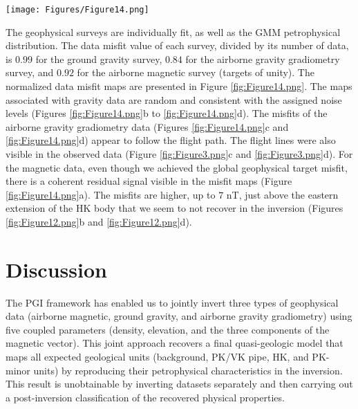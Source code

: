 \documentclass[paper, twocolumn]{geophysics} %
\begin{document}


\begin{figure*}[!ht]
\centering
\texttt{[image: Figures/Figure14.png]}
\caption{Normalized data misfits for all the datasets from the multi-physics PGI with geological domains and four rock units. (a) For the magnetic data; (b) for the gravity data; (c) and (d) for the gravity gradiometry data.}
\label{fig:Figure14.png}
\end{figure*}

The geophysical surveys are individually fit, as well as the GMM petrophysical distribution. The data misfit value of each survey, divided by its number of data, is $0.99$ for the ground gravity survey, $0.84$ for the airborne gravity gradiometry survey, and $0.92$ for the airborne magnetic survey (targets of unity). The normalized data misfit maps are presented in Figure \ref{fig:Figure14.png}. The maps associated with gravity data are random and consistent with the assigned noise levels (Figures \ref{fig:Figure14.png}b to \ref{fig:Figure14.png}d). The misfits of the airborne gravity gradiometry data (Figures \ref{fig:Figure14.png}c and \ref{fig:Figure14.png}d) appear to follow the flight path. The flight lines were also visible in the observed data (Figure \ref{fig:Figure3.png}c and \ref{fig:Figure3.png}d). For the magnetic data, even though we achieved the global geophysical target misfit, there is a coherent residual signal visible in the misfit maps (Figure \ref{fig:Figure14.png}a). The misfits are higher, up to $7$ nT, just above the eastern extension of the HK body that we seem to not recover in the inversion (Figures \ref{fig:Figure12.png}b and \ref{fig:Figure12.png}d).


\section{Discussion}

The PGI framework has enabled us to jointly invert three types of geophysical data (airborne magnetic, ground gravity, and airborne gravity gradiometry) using five coupled parameters (density, elevation, and the three components of the magnetic vector). This joint approach recovers a final quasi-geologic model that maps all expected geological units (background, PK/VK pipe, HK, and PK-minor units) by reproducing their petrophysical characteristics in the inversion. This result is unobtainable by inverting datasets separately and then carrying out a post-inversion classification of the recovered physical properties.
\end{document}
